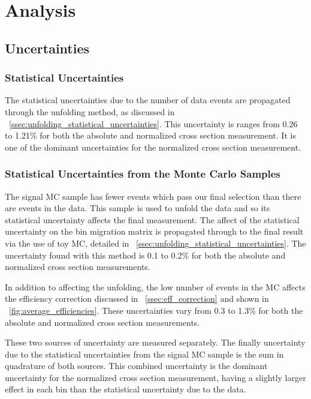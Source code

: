 \chapter{Analysis}
\label{chapter:analysis}

\section{Uncertainties}
\label{sec:uncertainties}


\subsection{Statistical Uncertainties}
\label{ssec:stat_uncertainty}

The statistical uncertainties due to the number of data events are propagated
through the unfolding method, as discussed in
\SEC~\ref{ssec:unfolding_statistical_uncertainties}. This uncertainty is
ranges from 0.26 to 1.21\% for both the absolute and normalized cross section
measurement. It is one of the dominant uncertainties for the normalized cross
section measurement.

\subsection{Statistical Uncertainties from the Monte Carlo Samples}
\label{ssec:mc_stat_uncertainty}

The \MADGRAPH signal MC sample has fewer events which pass our final selection
than there are events in the data. This sample is used to unfold the data and
so its statistical uncertainty affects the final measurement. The affect of the
statistical uncertainty on the bin migration matrix is propagated through to
the final result via the use of toy MC, detailed in
\SEC~\ref{ssec:unfolding_statistical_uncertainties}. The uncertainty found with
this method is 0.1 to 0.2\% for both the absolute and normalized cross section
measurements.

In addition to affecting the unfolding, the low number of events in the MC
affects the efficiency correction discussed in \SEC~\ref{ssec:eff_correction}
and shown in \FIG~\ref{fig:average_efficiencies}. These uncertainties vary from
0.3 to 1.3\% for both the absolute and normalized cross section measurements.

These two sources of uncertainty are measured separately. The finally
uncertainty due to the statistical uncertainties from the \MADGRAPH signal MC
sample is the sum in quadrature of both sources. This combined uncertainty is
the dominant uncertainty for the normalized cross section measurement, having a
slightly larger effect in each \phistar bin than the statistical uncertainty
due to the data.

